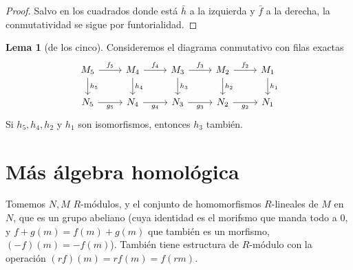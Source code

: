 \documentclass[spanish]{book}
\theoremstyle{definition}
\newtheorem*{lema}{Lema}
\begin{document}
\begin{proof}
	Salvo en los cuadrados donde está $\bar{h}$ a la izquierda y $\bar{f}$ a la derecha, la conmutatividad se sigue por funtorialidad.
\end{proof}
\begin{lema}[de los cinco]
	Consideremos el diagrama conmutativo con filas exactas
	\[\begin{tikzcd}
		M_5\arrow{r}{f_5}\arrow{d}{h_5}&M_4\arrow{r}{f_4}\arrow{d}{h_4}&M_3\arrow{r}{f_3}\arrow{d}{h_3}&M_2\arrow{r}{f_2}\arrow{d}{h_2}&M_1\arrow{d}{h_1}\\
		N_5\arrow[r,swap,"g_5"]&N_4\arrow[r,swap,"g_4"]&N_3\arrow[r,swap,"g_3"]&N_2\arrow[r,swap,"g_2"]&N_1
	\end{tikzcd}\]
	Si $h_5,h_4,h_2$ y $h_1$ son isomorfismos, entonces $h_3$ también.
\end{lema}

\section{Más álgebra homológica}
Tomemos $N,M$ $R$-módulos, y el conjunto de homomorfismos $R$-lineales de $M$ en $N$, que es un grupo abeliano (cuya identidad es el morifsmo que manda todo a $0$, y $f+g(m)=f(m)+g(m)$ que también es un morfismo, $(-f)(m)=-f(m)$). También tiene estructura de $R$-módulo con la operación $(rf)(m)=rf(m)=f(rm)$.
\end{document}
